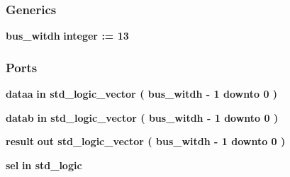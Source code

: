 \subsubsection*{Generics}
 \begin{DoxyCompactItemize}
\item 
{\bf bus\+\_\+witdh} {\bfseries {\bfseries \textcolor{comment}{integer}\textcolor{vhdlchar}{ }\textcolor{vhdlchar}{ }\textcolor{vhdlchar}{\+:}\textcolor{vhdlchar}{=}\textcolor{vhdlchar}{ }\textcolor{vhdlchar}{ } \textcolor{vhdldigit}{13} \textcolor{vhdlchar}{ }}}
\end{DoxyCompactItemize}
\subsubsection*{Ports}
 \begin{DoxyCompactItemize}
\item 
{\bf dataa}  {\bfseries {\bfseries \textcolor{keywordflow}{in}\textcolor{vhdlchar}{ }}} {\bfseries \textcolor{comment}{std\+\_\+logic\+\_\+vector}\textcolor{vhdlchar}{ }\textcolor{vhdlchar}{(}\textcolor{vhdlchar}{ }\textcolor{vhdlchar}{ }\textcolor{vhdlchar}{ }\textcolor{vhdlchar}{ }{\bfseries {\bf bus\+\_\+witdh}} \textcolor{vhdlchar}{-\/}\textcolor{vhdlchar}{ } \textcolor{vhdldigit}{1} \textcolor{vhdlchar}{ }\textcolor{keywordflow}{downto}\textcolor{vhdlchar}{ }\textcolor{vhdlchar}{ } \textcolor{vhdldigit}{0} \textcolor{vhdlchar}{ }\textcolor{vhdlchar}{)}\textcolor{vhdlchar}{ }} 
\item 
{\bf datab}  {\bfseries {\bfseries \textcolor{keywordflow}{in}\textcolor{vhdlchar}{ }}} {\bfseries \textcolor{comment}{std\+\_\+logic\+\_\+vector}\textcolor{vhdlchar}{ }\textcolor{vhdlchar}{(}\textcolor{vhdlchar}{ }\textcolor{vhdlchar}{ }\textcolor{vhdlchar}{ }\textcolor{vhdlchar}{ }{\bfseries {\bf bus\+\_\+witdh}} \textcolor{vhdlchar}{-\/}\textcolor{vhdlchar}{ } \textcolor{vhdldigit}{1} \textcolor{vhdlchar}{ }\textcolor{keywordflow}{downto}\textcolor{vhdlchar}{ }\textcolor{vhdlchar}{ } \textcolor{vhdldigit}{0} \textcolor{vhdlchar}{ }\textcolor{vhdlchar}{)}\textcolor{vhdlchar}{ }} 
\item 
{\bf result}  {\bfseries {\bfseries \textcolor{keywordflow}{out}\textcolor{vhdlchar}{ }}} {\bfseries \textcolor{comment}{std\+\_\+logic\+\_\+vector}\textcolor{vhdlchar}{ }\textcolor{vhdlchar}{(}\textcolor{vhdlchar}{ }\textcolor{vhdlchar}{ }\textcolor{vhdlchar}{ }\textcolor{vhdlchar}{ }{\bfseries {\bf bus\+\_\+witdh}} \textcolor{vhdlchar}{-\/}\textcolor{vhdlchar}{ } \textcolor{vhdldigit}{1} \textcolor{vhdlchar}{ }\textcolor{keywordflow}{downto}\textcolor{vhdlchar}{ }\textcolor{vhdlchar}{ } \textcolor{vhdldigit}{0} \textcolor{vhdlchar}{ }\textcolor{vhdlchar}{)}\textcolor{vhdlchar}{ }} 
\item 
{\bf sel}  {\bfseries {\bfseries \textcolor{keywordflow}{in}\textcolor{vhdlchar}{ }}} {\bfseries \textcolor{comment}{std\+\_\+logic}\textcolor{vhdlchar}{ }} 
\end{DoxyCompactItemize}


